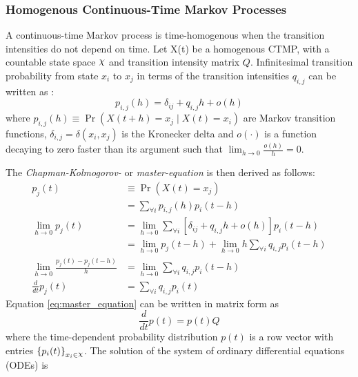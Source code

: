 \subsubsection{Homogenous Continuous-Time Markov Processes}
\label{sec:homo_CTMP}
A continuous-time Markov process is time-homogenous when the transition intensities do not depend on time. Let X(t) be a homogenous CTMP, with a countable state space $ \rchi $ and transition intensity matrix $ Q $. Infinitesimal transition probability from state $ x_{i} $ to $ x_{j} $ in terms of the transition intensities $ q_{i,j} $ can be written as \cite{Cohn2010a}:
\begin{equation}
p_{i,j}(h)=\delta_{ij}+q_{i,j} h+o(h)
\label{eq:Markov_trans_func}
\end{equation}
where $ p_{i, j}(h) \equiv \operatorname{Pr}(X(t+h)=x_j\mid X(t)=x_i) $ are Markov transition functions, $ \delta_{i,j} = \delta(x_i,x_j)$ is the Kronecker delta and $ o(\cdot) $ is a function decaying to zero faster than its argument such that $ \lim_{h \to 0} \frac{o(h)}{h} = 0 $.\par
The \textit{Chapman-Kolmogorov-} or \textit{master-equation} is then derived as follows:
\begin{align}
p_{j}(t) &\equiv \operatorname{Pr}(X(t) = x_{j}) \nonumber\\
& =\sum_{\forall i} p_{i, j}(h) p_{i}(t-h) \nonumber \\
\lim_{h\rightarrow 0} p_{j}(t) 
& = \lim_{h\rightarrow 0} \sum_{\forall i} \left[ \delta_{ij}+q_{i,j} h+o(h)\right]  p_{i}(t-h) \nonumber \\ 
& = \lim_{h\rightarrow 0} p_{j}(t-h) + \lim_{h\rightarrow 0} h \sum_{\forall i} q_{i,j} p_{i}(t-h) \nonumber \\
\lim_{h\rightarrow 0} \frac{p_{j}(t) - p_{j}(t-h)}{h} 
&= \lim_{h\rightarrow 0} \sum_{\forall i} q_{i,j} p_{i}(t-h) \nonumber\\
\frac{d}{dt} p_{j}(t) & = \sum_{\forall i} q_{i,j} p_{i}(t)
\label{eq:master_equation}
\end{align}
Equation \ref{eq:master_equation} can be written in matrix form as
\begin{equation}
\frac{d}{dt} p(t) = p(t)Q
\end{equation}
where the time-dependent probability distribution $ p(t) $ is a row vector with entries $ \left\lbrace p_{i}(t)\right\rbrace_{x_{i}\in \rchi} $. The solution of the system of ordinary differential equations (ODEs) is
